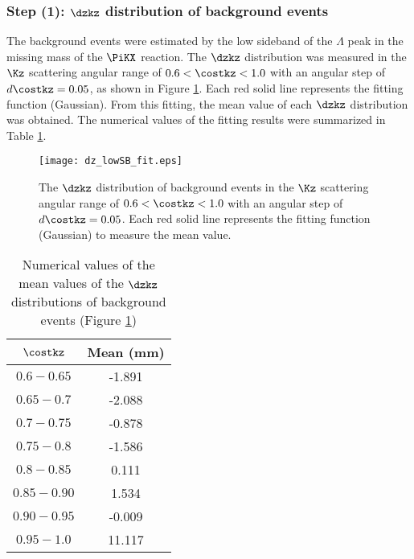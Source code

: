 \subsubsection{Step (1): $\dzkz$ distribution of background events}

The background events were estimated by the low sideband of the $\Lambda$ peak in the missing mass of the $\PiKX$ reaction. The $\dzkz$ distribution was measured in the $\Kz$ scattering angular range of $0.6<\costkz<1.0$ with an angular step of $d\costkz=0.05$, as shown in Figure \ref{fig-dz_lowSB_fit}. Each red solid line represents the fitting function (Gaussian). From this fitting, the mean value of each $\dzkz$ distribution was obtained. The numerical values of the fitting results were summarized in Table \ref{tab-dz_lowSB_fit}. 

\begin{figure}[h]
  \centering
  \texttt{[image: dz\_lowSB\_fit.eps]}
  \caption{The $\dzkz$ distribution of background events in the $\Kz$ scattering angular range of $0.6<\costkz<1.0$ with an angular step of $d\costkz=0.05$. Each red solid line represents the fitting function (Gaussian) to measure the mean value.}
  \label{fig-dz_lowSB_fit}
\end{figure}

\begin{table}[!h] 
  \begin{center}
  \caption{Numerical values of the mean values of the $\dzkz$ distributions of background events (Figure \ref{fig-dz_lowSB_fit})}
  \centering
  \begin{threeparttable}
    \begin{tabular}{cc}
    $\costkz$ & Mean (mm) \\
    \midrule\midrule
    $0.6-0.65$ & -1.891 \\
    \midrule
    $0.65-0.7$ & -2.088 \\
    \midrule
    $0.7-0.75$ & -0.878 \\
    \midrule
    $0.75-0.8$ & -1.586 \\
    \midrule
    $0.8-0.85$ & 0.111 \\
    \midrule
    $0.85-0.90$ & 1.534 \\
    \midrule
    $0.90-0.95$ & -0.009 \\
    \midrule
    $0.95-1.0$ & 11.117 \\
    \end{tabular}
  \end{threeparttable}
  \label{tab-dz_lowSB_fit}
  \end{center}
\end{table}

